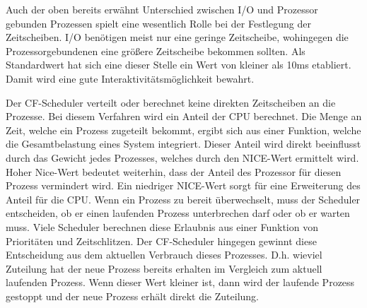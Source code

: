 Auch der oben bereits erwähnt Unterschied zwischen I/O und Prozessor gebunden Prozessen spielt eine wesentlich Rolle bei der Festlegung der Zeitscheiben. I/O benötigen meist nur eine geringe Zeitscheibe, wohingegen die Prozessorgebundenen eine größere Zeitscheibe bekommen sollten. Als Standardwert hat sich eine dieser Stelle ein Wert von kleiner als 10ms etabliert. Damit wird eine gute Interaktivitätsmöglichkeit bewahrt.

Der CF-Scheduler verteilt oder berechnet keine direkten Zeitscheiben an die Prozesse. Bei diesem Verfahren wird ein Anteil der CPU berechnet. Die Menge an Zeit, welche ein Prozess zugeteilt bekommt, ergibt sich aus einer Funktion, welche die Gesamtbelastung eines System integriert.
Dieser Anteil wird direkt beeinflusst durch das Gewicht jedes Prozesses, welches durch den NICE-Wert ermittelt wird. Hoher Nice-Wert bedeutet weiterhin, dass der Anteil des Prozessor für diesen Prozess vermindert wird. Ein niedriger NICE-Wert sorgt für eine Erweiterung des Anteil für die CPU.
Wenn ein Prozess zu bereit überwechselt, muss der Scheduler entscheiden, ob er einen laufenden Prozess unterbrechen darf oder ob er warten muss. Viele Scheduler berechnen diese Erlaubnis aus einer Funktion von Prioritäten und Zeitschlitzen. Der CF-Scheduler hingegen gewinnt diese Entscheidung aus dem aktuellen Verbrauch dieses Prozesses. D.h. wieviel Zuteilung hat der neue Prozess bereits erhalten im Vergleich zum aktuell laufenden Prozess. Wenn dieser Wert kleiner ist, dann wird der laufende Prozess gestoppt und der neue Prozess erhält direkt die Zuteilung.